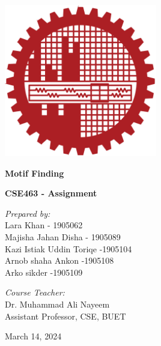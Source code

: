 \documentclass[11pt]{article}
\begin{document}
\begin{titlepage}
  \begin{center}
    \includegraphics[width=0.5\textwidth]{buet.png}\par
    \vspace{1cm}
    {\huge\bfseries Motif Finding\par}
    \vspace{1cm}
    {\Large\bfseries CSE463 - Assignment\par}

    \vspace{2cm}
    \begin{minipage}{0.8\textwidth}
      \begin{flushleft}
        \emph{\Large Prepared by:}\\
        \Large Lara Khan - 1905062\\
        \Large Majisha Jahan Disha - 1905089\\
        \Large Kazi Istiak Uddin Toriqe -1905104\\
        \Large Arnob shaha Ankon -1905108 \\
        \Large Arko sikder -1905109
      \end{flushleft}
    \end{minipage}

    \vspace{1cm}
    \begin{minipage}{0.8\textwidth}
      \begin{flushright}
        \emph{\Large Course Teacher:}\\
        \Large Dr. Muhammad Ali Nayeem\\
        \Large Assistant Professor, CSE, BUET
      \end{flushright}
    \end{minipage}

    \vfill

    {\large March 14, 2024 \par}
  \end{center}
\end{titlepage}
\tableofcontents 
\pagebreak
\end{document}
